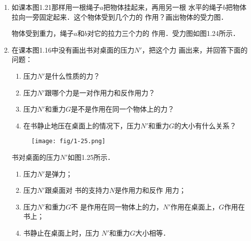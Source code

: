 \begin{enumerate}
\item 如课本图1.21那样用一根绳子$a$把物体挂起来，再用另一根
水平的绳子$b$把物体拉向一旁固定起来．这个物体受到几个力的
作用？画出物体的受力图．

\begin{solution}
    物体受到重力，绳子$a$和$b$对它的拉力三个力的
作用．受力图如图1.24所示．
\end{solution}

\item  在课本图1.16中没有画出书对桌面的压力$N'$，把这个力
画出来，并回答下面的问题：
\begin{enumerate}
\item 压力$N'$是什么性质的力？
\item 压力$N'$跟哪个力是一对作用力和反作用力？
\item 压力$N'$和重力$G$是不是作用在同一个物体上的力？
\item 在书静止地压在桌面上的情况下，压力$N'$和重力$G$的大小有什么关系？
\end{enumerate}

\begin{figure}[htp]\centering
    \begin{minipage}[t]{0.48\textwidth}
    \centering
{}
    \caption{}
    \end{minipage}
    \begin{minipage}[t]{0.48\textwidth}
    \centering
    \texttt{[image: fig/1-25.png]}
    \caption{}
    \end{minipage}
    \end{figure}

\begin{solution}
    书对桌面的压力$N'$如图1.25所示．
\begin{enumerate}
\item 压力$N'$是弹力；    
\item 压力$N'$跟桌面对
书的支持力$N$是作用力和反作
用力；    
\item 压力$N'$和重力$G$不
是作用在同一物体上的力，$N'$作用在桌面上，$G$作用在书上；    
\item 书静止在桌面上时，压力
$N'$和重力$G$大小相等．
\end{enumerate}

\end{solution}
\end{enumerate}

